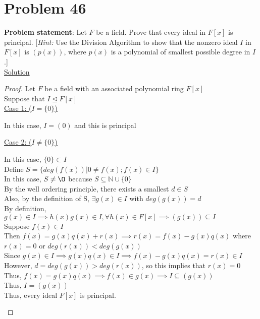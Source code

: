 \documentclass{article} %
\begin{document}
\section*{Problem 46}


\textbf{Problem statement}: Let $F$ be a field.  Prove that every ideal in $F[x]$ is principal. [\textit{Hint:} Use the Division Algorithm to show that the nonzero ideal $I$ in $F[x]$ is $(p(x))$, where $p(x)$ is a polynomial of smallest possible degree in $I$.]
\\

\underline{Solution}
\begin{addmargin}[1em]{0em}
\begin{proof}
Let $F$ be a field with an associated polynomial ring $F[x]$
\\Suppose that $I \unlhd F[x]$
\\ \underline{Case 1: ($I = \{0\}$)}
\begin{addmargin}[1em]{0em}
In this case, $I = (0)$ and this is principal
\end{addmargin}
\underline{Case 2: ($I \neq \{0\}$)}
\begin{addmargin}[1em]{0em}
In this case, $\{0\} \subset I$
\\Define $S = \{deg(f(x)) | 0 \neq f(x); f(x) \in I\}$
\\In this case, $S \neq \O$ because $S \subseteq \mathbb{N} \cup \{0\}$
\\By the well ordering principle, there exists a smallest $d \in S$
\\Also, by the definition of S, $\exists g(x) \in I$ with $deg(g(x)) = d$
\\ \marginpar{$\supseteq$} By definition, $g(x) \in I \implies h(x)g(x) \in I, \forall h(x) \in F[x] \implies (g(x)) \subseteq I$
\\ \marginpar{$\subseteq$} Suppose $f(x) \in I$
\\ Then $f(x) = g(x)q(x) + r(x) \implies r(x) = f(x) - g(x)q(x)$ where $r(x) = 0$ or $deg(r(x)) < deg(g(x))$
\\Since $g(x) \in I \implies g(x)q(x) \in I \implies f(x) - g(x)q(x) = r(x) \in I$
\\However, $d = deg(g(x)) > deg(r(x))$, so this implies that $r(x) = 0$
\\Thus, $f(x) = g(x)q(x) \implies f(x) \in g(x) \implies I \subseteq (g(x))$
\\Thus, $I = (g(x))$
\\Thus, every ideal $F[x]$ is principal.
\end{addmargin}
\end{proof}
\end{addmargin}

\newpage
\end{document}
